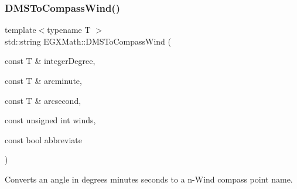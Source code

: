 \subsubsection{\texorpdfstring{D\+M\+S\+To\+Compass\+Wind()}{DMSToCompassWind()}}
{\footnotesize\ttfamily template$<$typename T $>$ \\
std\+::string E\+G\+X\+Math\+::\+D\+M\+S\+To\+Compass\+Wind (\begin{DoxyParamCaption}\item[{const T \&}]{integer\+Degree,  }\item[{const T \&}]{arcminute,  }\item[{const T \&}]{arcsecond,  }\item[{const unsigned int}]{winds,  }\item[{const bool}]{abbreviate }\end{DoxyParamCaption})}



Converts an angle in degrees minutes seconds to a n-\/\+Wind compass point name. 

